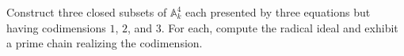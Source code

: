 \begin{problem}\label{chal:vi31-01}
Construct three closed subsets of $\mathbb A^4_k$ each presented by three equations but having codimensions $1$, $2$, and $3$. For each, compute the radical ideal and exhibit a prime chain realizing the codimension.
\end{problem}
